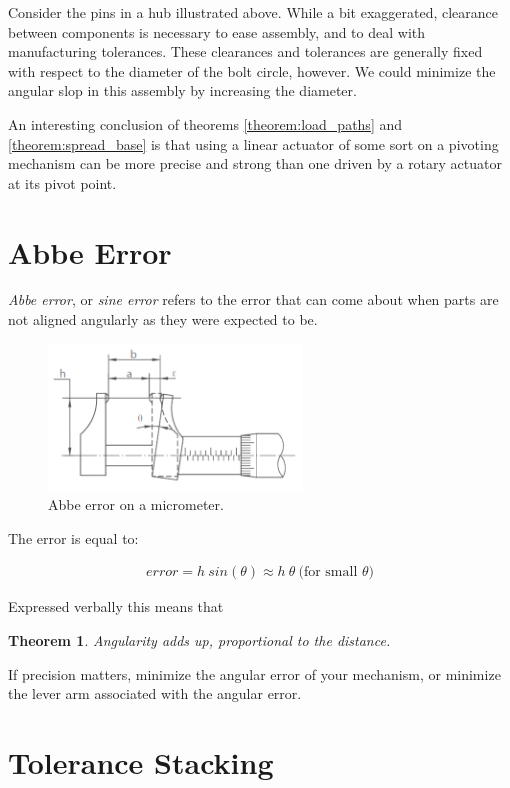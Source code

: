 \documentclass[10pt,letterpaper]{book}
\newtheorem{theorem}{Theorem}
\begin{document}
Consider the pins in a hub illustrated above. While a bit exaggerated, clearance between components is necessary to ease assembly, and to deal with manufacturing tolerances. These clearances and tolerances are generally fixed with respect to the diameter of the bolt circle, however. We could minimize the angular slop in this assembly by increasing the diameter.

An interesting conclusion of theorems \ref{theorem:load_paths} and \ref{theorem:spread_base} is that using a linear actuator of some sort on a pivoting mechanism can be more precise and strong than one driven by a rotary actuator at its pivot point.

\section{Abbe Error}

\textit{Abbe error}, or \textit{sine error} refers to the error that can come about when parts are not aligned angularly as they were expected to be.

\begin{figure}[H]
	\includegraphics[width=0.6\textwidth]{imgs/abbe_error.png}
	\caption{Abbe error on a micrometer.}
\end{figure}

The error is equal to:

\begin{align}
	error = h \ sin(\theta) \approx h \ \theta \ \mbox{(for small $\theta$)}
\end{align}

Expressed verbally this means that

\begin{theorem} \label{theorem:abbe}
Angularity adds up, proportional to the distance.
\end{theorem}

If precision matters, minimize the angular error of your mechanism, or minimize the lever arm associated with the angular error.


\section{Tolerance Stacking}
\end{document}
